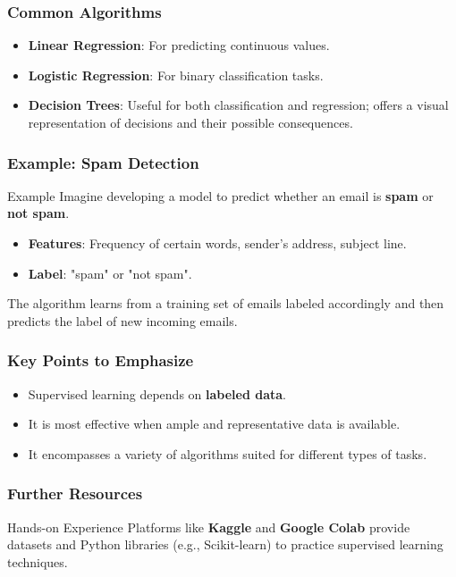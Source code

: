 \documentclass{beamer}
\begin{document}
\begin{frame}[fragile]
    \frametitle{Common Algorithms}
    \begin{itemize}
        \item \textbf{Linear Regression}: For predicting continuous values.
        \item \textbf{Logistic Regression}: For binary classification tasks.
        \item \textbf{Decision Trees}: Useful for both classification and regression; offers a visual representation of decisions and their possible consequences.
    \end{itemize}
\end{frame}

\begin{frame}[fragile]
    \frametitle{Example: Spam Detection}
    \begin{block}{Example}
        Imagine developing a model to predict whether an email is \textbf{spam} or \textbf{not spam}. 
    \end{block}
    \begin{itemize}
        \item \textbf{Features}: Frequency of certain words, sender's address, subject line.
        \item \textbf{Label}: "spam" or "not spam".
    \end{itemize}
    The algorithm learns from a training set of emails labeled accordingly and then predicts the label of new incoming emails.
\end{frame}

\begin{frame}[fragile]
    \frametitle{Key Points to Emphasize}
    \begin{itemize}
        \item Supervised learning depends on \textbf{labeled data}.
        \item It is most effective when ample and representative data is available.
        \item It encompasses a variety of algorithms suited for different types of tasks.
    \end{itemize}
\end{frame}

\begin{frame}[fragile]
    \frametitle{Further Resources}
    \begin{block}{Hands-on Experience}
        Platforms like \textbf{Kaggle} and \textbf{Google Colab} provide datasets and Python libraries (e.g., Scikit-learn) to practice supervised learning techniques.
    \end{block}
\end{frame}
\end{document}
